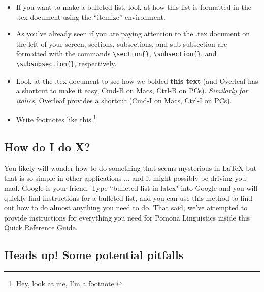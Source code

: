 \documentclass{article}
\begin{document}
\begin{itemize}

\item If you want to make a bulleted list, look at how this list is formatted in the .tex document using the ``itemize'' environment.

\item As you've already seen if you are paying attention to the .tex document on the left of your screen, sections, subsections, and sub-subsection are formatted with the commands \verb|\section{}|, \verb|\subsection{}|, and \verb|\subsubsection{}|, respectively.

\item Look at the .tex document to see how we bolded \textbf{this text} (and Overleaf has a shortcut to make it easy, Cmd-B on Macs, Ctrl-B on PCs). \textit{Similarly for italics}, Overleaf provides a shortcut (Cmd-I on Macs, Ctrl-I on PCs).

\item Write footnotes like this.\footnote{Hey, look at me, I'm a footnote.}

\end{itemize}

\subsection{How do I do X?}

You likely will wonder how to do something that seems mysterious in \LaTeX{} but that is so simple in other applications ... and it might possibly be driving you mad. Google is your friend. Type ``bulleted list in latex" into Google and you will quickly find instructions for a bulleted list, and you can use this method to find out how to do almost anything you need to do. That said, we've attempted to provide instructions for everything you need for Pomona Linguistics inside this \href{https://www.overleaf.com/latex/templates/pomona-linguistics-quick-reference-guide/jthrqbrktmrd}{Quick Reference Guide}.

\subsection{Heads up! Some potential pitfalls}
\end{document}
